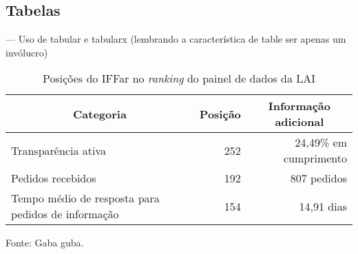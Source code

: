 \subsection{Tabelas}
--- Uso de tabular e tabularx (lembrando a característica de table ser apenas um invólucro)

\begin{table}[H]
  \Centering\singlespacing

  \caption{Posições do IFFar no \textit{ranking} do painel de dados da LAI}
  \label{tabela:cgu-iffar}
  \begin{tabularx}{12cm}
    {X r r} %
    \hline
    \multicolumn{1}{c}{\textbf{Categoria}}    &   
    \multicolumn{1}{c}{\textbf{Posição}}  & 
    \multicolumn{1}{c}{\textbf{Informação adicional}} \\
    \hline

    Transparência ativa &
    252\textordmasculine{} &
    24,49\% em cumprimento \\

    Pedidos recebidos &
    192\textordmasculine{} &
    807 pedidos \\

    Tempo médio de resposta para pedidos de informação       &   
    154\textordmasculine{} &
    14,91 dias \\
    \hline

  \end{tabularx}

\hspace{\fill}

\footnotesize

Fonte: Gaba guba.
\end{table}


